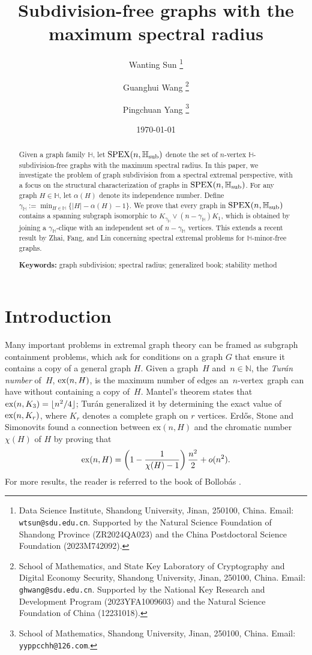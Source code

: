 \documentclass[11pt, a4paper]{article}
\title{Subdivision-free graphs with the maximum spectral radius}
\author{
Wanting Sun \thanks{Data Science Institute, Shandong University, Jinan, 250100, China. Email: {\tt wtsun@sdu.edu.cn}. Supported by the Natural Science Foundation of Shandong Province (ZR2024QA023) and the China Postdoctoral Science Foundation (2023M742092).}
\and
Guanghui Wang \thanks{School of Mathematics, and State Key Laboratory of Cryptography and Digital Economy Security, Shandong University, Jinan, 250100, China. Email: {\tt ghwang@sdu.edu.cn}. Supported by the National Key Research and Development Program (2023YFA1009603) and the Natural Science Foundation of China (12231018).
}
\and 
Pingchuan Yang \thanks{School of Mathematics, Shandong University, Jinan, 250100, China. Email: {\tt yyppcchh@126.com}.}
}
\date{\today}
\theoremstyle{definition}
\newcommand{\ex}{{\rm ex}}
\newcommand{\<}{\subseteq}
\begin{document}
\maketitle
\begin{abstract}
    Given a graph family $\mathbb{H}$, let ${\rm SPEX}(n,\mathbb{H}_{\rm sub})$ denote the set of $n$-vertex $\mathbb{H}$-subdivision-free graphs with the maximum spectral radius. In this paper, we investigate the problem of graph subdivision from a spectral extremal perspective, with a focus on the structural characterization of graphs in ${\rm SPEX}(n,\mathbb{H}_{\rm sub})$. For any graph $H \in \mathbb{H}$, let $\alpha(H)$ denote its independence number. Define $\gamma_\mathbb{H}:=\min_{H\in \mathbb{H}}\{|H| - \alpha(H) - 1\}$. 
    We prove that every  graph in ${\rm SPEX}(n,\mathbb{H}_{\rm sub})$ contains a spanning subgraph isomorphic to $K_{\gamma_\mathbb{H}}\vee (n-\gamma_\mathbb{H})K_1$, which is obtained by joining a $\gamma_\mathbb{H}$-clique with an independent set of $n-\gamma_\mathbb{H}$ vertices.
    This extends a recent result by Zhai, Fang, and Lin concerning spectral extremal problems for $\mathbb{H}$-minor-free graphs. 

    \vspace{2mm}
    \textbf{Keywords:} graph subdivision; spectral radius; generalized book;  stability method
\end{abstract}
\maketitle

\section{Introduction}

Many important problems in extremal graph theory can  be framed as subgraph containment problems, which ask for conditions on a graph $G$ that ensure it contains a copy of a general graph $H$. Given a graph~$H$ and~$n\in\mathbb{N}$, the {\textit{Tur\'an number}} of~$H$, $\ex(n,H)$, is the maximum number of edges an~$n$-vertex~graph can have without containing a copy of~$H$. 
Mantel's theorem states that $\ex(n,K_3)=\lfloor n^2/4\rfloor$; Tur\'{a}n  \cite{Tu} generalized it by determining the exact value of $\ex(n,K_r)$, where $K_r$ denotes a complete graph on $r$ vertices. Erd\H{o}s, Stone and Simonovits \cite{Erdos1966,1946ESS1} found a  connection between $\mathrm{ex}(n, H)$ and the chromatic number $\chi(H)$ of $H$ by proving that 
\begin{align*}
    \ex(n,H)=\left(1-\frac{1}{\chi(H)-1}\right)\frac{n^2}{2}+o(n^2).
\end{align*}
For more results, the reader is referred to the book of Bollob\'{a}s \cite{EGT}.
\end{document}
